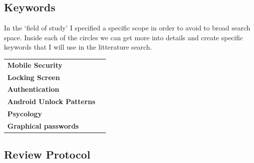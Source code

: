     \subsection*{Keywords}  

      In the `field of study' I specified a specific scope in order to avoid to broad search space. 
      Inside each of the circles we can get more into details and create specific keywords that I will use in 
      the litterature search. 

      
        \begin{tabular}{ || l | l ||}
          \hline
          {\bf Mobile Security} & \\
          {\bf Locking Screen} &  \\
          {\bf Authentication} &  \\
          {\bf Android Unlock Patterns} & \\ 
          {\bf Psycology} & \\
          {\bf Graphical passwords} & \\
          \hline

          
        \end{tabular}




    \subsection*{Review Protocol}


